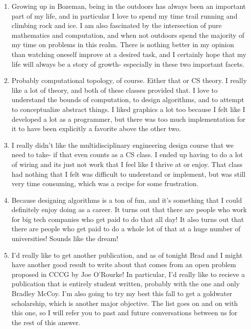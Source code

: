 \documentclass{article}
\begin{document}
	\begin{enumerate}
		\item Growing up in Bozeman, being in the outdoors has always been an important
			part of my life, and in particular I love to spend my time trail running
			and climbing rock and ice. I am also fascinated by the intersection of pure
			mathematics and computation, and when not outdoors spend the majority of my
			time on problems in this realm. There is nothing better in my opinion than
			watching oneself improve at a desired task, and I certainly hope that my life
			will always be a story of growth- especially in these two important facets.

	    	\item Probably computational topology, of course. Either that or CS theory.
		I really like a lot of theory, and both of these classes provided that.
		I love to understand the bounds of computation, to design algorithms, 
		and to attempt to conceptualize abstract things. I liked graphics a lot too
		because I felt like I developed a lot as a programmer, but there was too much
		implementation for it to have been explicitly a favorite above the other two.
	    	
		\item I really didn't like the multidisciplinary engineering design course
		that we need to take- if that even counts as a CS class. I ended up
		having to do a lot of wiring and its just not work that I feel like I
		thrive at or enjoy. That class had nothing that I felt was difficult
		to understand or implement, but was still very time consuming, which
		was a recipe for some frustration.
	    	
		\item Because designing algorithms is a ton of fun, and it's something that I
		could definitely enjoy doing as a career. It turns out that there are people who
		work for big tech companies who get paid to do that all day! It also turns out that
		there are people who get paid to do a whole lot of that at a huge number of universities!
		Sounds like the dream!
	
		\item I'd really like to get another publication, and as of tonight Brad and I
		might have another good result to write about that comes from an open problem proposed
		in CCCG by Joe O'Rourke! In particular, I'd really like
		to recieve a publication that is entirely student written, probably with the
		one and only Bradley McCoy. I'm also going to try my best this fall to get a 
		goldwater scholarship, which is another major objective. The list goes on and on
		with this one, so I will refer you to past and future conversations between us for 
		the rest of this answer.
	        

\end{enumerate}
\end{document}
